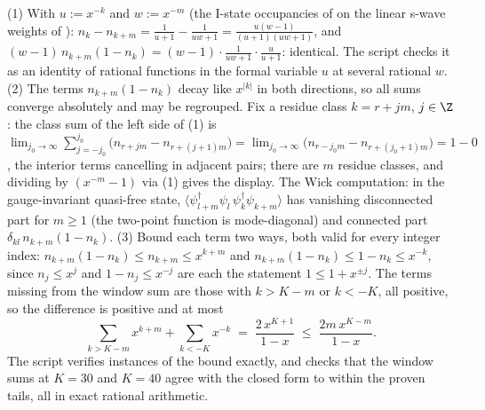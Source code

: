 (1) With $u := x^{-k}$ and $w := x^{-m}$ (the I-state occupancies of  on the linear s-wave weights of ): $n_k - n_{k+m} = \tfrac{1}{u+1} - \tfrac{1}{uw+1} = \tfrac{u(w-1)}{(u+1)(uw+1)}$, and $(w-1)\,n_{k+m}(1-n_k) = (w-1)\cdot\tfrac{1}{uw+1}\cdot\tfrac{u}{u+1}$: identical. The script checks it as an identity of rational functions in the formal variable $u$ at several rational $w$.
(2) The terms $n_{k+m}(1 - n_k)$ decay like $x^{|k|}$ in both directions, so all sums converge absolutely and may be regrouped. Fix a residue class $k = r + jm$, $j \in \Z$: the class sum of the left side of (1) is $\lim_{j_0 \to \infty}\sum_{j=-j_0}^{j_0}\bigl(n_{r+jm} - n_{r+(j+1)m}\bigr) = \lim_{j_0 \to \infty}\bigl(n_{r-j_0 m} - n_{r+(j_0+1)m}\bigr) = 1 - 0$, the interior terms cancelling in adjacent pairs; there are $m$ residue classes, and dividing by $(x^{-m}-1)$ via (1) gives the display. The Wick computation: in the gauge-invariant quasi-free state, $\langle \psi^\dagger_{l+m}\psi_l\,\psi^\dagger_k\psi_{k+m}\rangle$ has vanishing disconnected part for $m \ge 1$ (the two-point function is mode-diagonal) and connected part $\delta_{kl}\,n_{k+m}(1 - n_k)$.
(3) Bound each term two ways, both valid for every integer index: $n_{k+m}(1-n_k) \le n_{k+m} \le x^{k+m}$ and $n_{k+m}(1-n_k) \le 1 - n_k \le x^{-k}$, since $n_j \le x^j$ and $1 - n_j \le x^{-j}$ are each the statement $1 \le 1 + x^{\pm j}$. The terms missing from the window sum are those with $k > K - m$ or $k < -K$, all positive, so the difference is positive and at most
\[
\sum_{k > K-m} x^{k+m} + \sum_{k < -K} x^{-k} \;=\; \frac{2\,x^{K+1}}{1-x} \;\le\; \frac{2m\,x^{K-m}}{1-x}.
\]
The script verifies instances of the bound exactly, and checks that the window sums at $K = 30$ and $K = 40$ agree with the closed form to within the proven tails, all in exact rational arithmetic.
